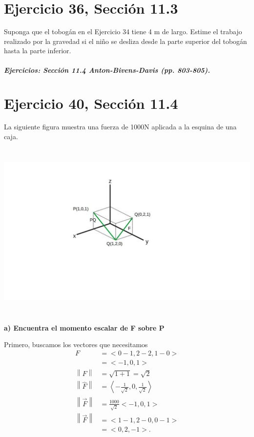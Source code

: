 \documentclass[11pt,letterpaper]{article}
\begin{document}
\section{Ejercicio 36, Sección 11.3}

Suponga que el tobogán en el Ejercicio 34 tiene 4 m de largo. Estime el trabajo realizado por la gravedad si el niño se desliza desde la parte superior del tobogán hasta la parte inferior.


\subparagraph{Ejercicios: Sección 11.4 Anton-Bivens-Davis (pp. 803-805).}

\section{Ejercicio 40, Sección 11.4}
La siguiente figura muestra una fuerza de 1000N aplicada a la esquina de una caja.
\begin{center}
    \includegraphics[height=9cm]{imagenes/Ej40.jpg}
\end{center}

\textbf{a) Encuentra el momento escalar de F sobre P}

Primero, buscamos los vectores que necesitamos
\begin{equation*}
    \begin{split}
        F &= <0-1,2-2,1-0>\\
        &= <-1,0,1>\\
        \left\| F \right\| &= \sqrt{1+1} = \sqrt{2}\\
        \left\| \hat{F} \right\| &= \left< -\frac{1}{\sqrt{2}}, 0, \frac{1}{\sqrt{2}}\right>\\
        \left\| \overrightarrow{F} \right\| &= \frac{1000}{\sqrt{2}}<-1,0,1>\\
        \left\| \overrightarrow{F} \right\| &= <1-1,2-0,0-1>\\
        &=<0,2,-1>.
    \end{split}
\end{equation*}
\end{document}
